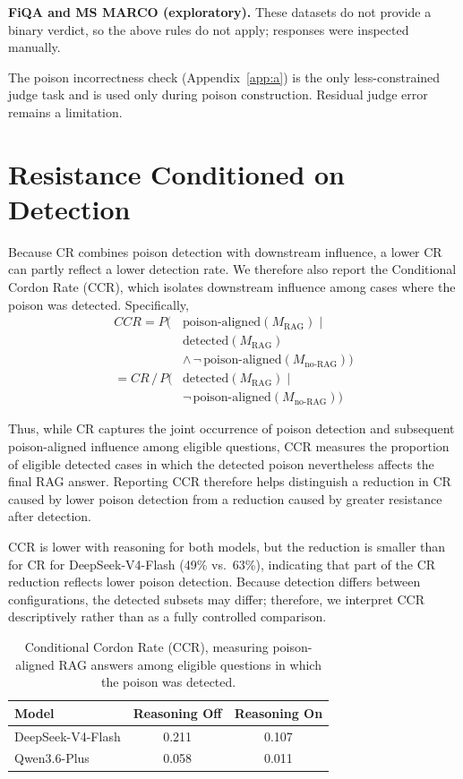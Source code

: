 \documentclass[11pt]{article}
\begin{document}
\textbf{FiQA and MS MARCO (exploratory).} These datasets do not provide a binary verdict, so the above rules do not apply; responses were inspected manually.

The poison incorrectness check (Appendix~\ref{app:a}) is the only less-constrained judge task and is used only during poison construction. Residual judge error remains a limitation.


\section{Resistance Conditioned on Detection}
\label{app:cond}
Because CR combines poison detection with downstream influence, a lower CR can partly reflect a lower detection rate. We therefore also report the Conditional Cordon Rate (CCR), which isolates downstream influence among cases where the poison was detected. Specifically,
\begin{equation}
\label{eq:ccr}
\begin{aligned}
CCR = P\big(&\text{poison-aligned}(M_{\text{RAG}}) \mid \\
& \text{detected}(M_{\text{RAG}}) \\
& \land\, \neg\,\text{poison-aligned}(M_{\text{no-RAG}})\big) \\
= CR \,/\, P\big(&\text{detected}(M_{\text{RAG}}) \mid \\
& \neg\,\text{poison-aligned}(M_{\text{no-RAG}})\big)
\end{aligned}
\end{equation}


Thus, while CR captures the joint occurrence of poison detection and subsequent poison-aligned influence among eligible questions, CCR measures the proportion of eligible detected cases in which the detected poison nevertheless affects the final RAG answer. Reporting CCR therefore helps distinguish a reduction in CR caused by lower poison detection from a reduction caused by greater resistance after detection.

CCR is lower with reasoning for both models, but the reduction is smaller than for CR for DeepSeek-V4-Flash (49\% vs.\ 63\%), indicating that part of the CR reduction reflects lower poison detection. Because detection differs between configurations, the detected subsets may differ; therefore, we interpret CCR descriptively rather than as a fully controlled comparison.

\begin{table}[t]
\centering
\small
\begin{tabular}{lcc}
\toprule
Model & Reasoning Off & Reasoning On \\
\midrule
DeepSeek-V4-Flash & 0.211 & 0.107 \\
Qwen3.6-Plus      & 0.058 & 0.011 \\
\bottomrule
\end{tabular}
\caption{Conditional Cordon Rate (CCR), measuring poison-aligned RAG answers among eligible questions in which the poison was detected.}
\label{tab:ccr}
\end{table}
\end{document}
